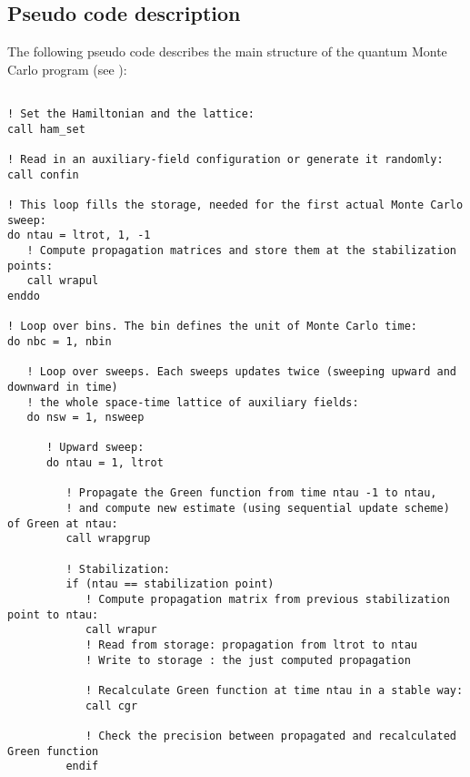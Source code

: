 %
\subsection{Pseudo code description}\label{sec:pseudocode}
%
The following pseudo code describes the main structure of the quantum Monte Carlo program (see ):
\lstset{style=fortran_pseudo_code}
\begin{lstlisting}

! Set the Hamiltonian and the lattice:
call ham_set

! Read in an auxiliary-field configuration or generate it randomly:
call confin

! This loop fills the storage, needed for the first actual Monte Carlo sweep:
do ntau = ltrot, 1, -1 
   ! Compute propagation matrices and store them at the stabilization points:
   call wrapul 
enddo

! Loop over bins. The bin defines the unit of Monte Carlo time:
do nbc = 1, nbin 

   ! Loop over sweeps. Each sweeps updates twice (sweeping upward and downward in time)
   ! the whole space-time lattice of auxiliary fields:
   do nsw = 1, nsweep 
   
      ! Upward sweep:
      do ntau = 1, ltrot
      
         ! Propagate the Green function from time ntau -1 to ntau, 
         ! and compute new estimate (using sequential update scheme) of Green at ntau: 
         call wrapgrup
         
         ! Stabilization:      
         if (ntau == stabilization point)
            ! Compute propagation matrix from previous stabilization point to ntau: 
            call wrapur
            ! Read from storage: propagation from ltrot to ntau
            ! Write to storage : the just computed propagation 
                        
            ! Recalculate Green function at time ntau in a stable way:
            call cgr
            
            ! Check the precision between propagated and recalculated Green function
         endif
        

\end{lstlisting}
